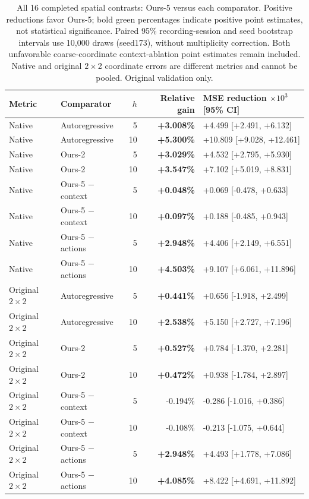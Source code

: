 \begin{table}[!htbp]
\centering\small
\setlength{\tabcolsep}{4pt}
\begin{tabular}{@{}llrrl@{}}
\toprule Metric & Comparator & $h$ & Relative gain & MSE reduction $\times10^3$ [95\% CI] \\
\midrule
Native & Autoregressive & 5 & \textcolor{gainpositive}{\textbf{+3.008\%}} & +4.499 [+2.491, +6.132] \\
Native & Autoregressive & 10 & \textcolor{gainpositive}{\textbf{+5.300\%}} & +10.809 [+9.028, +12.461] \\
Native & Ours-2 & 5 & \textcolor{gainpositive}{\textbf{+3.029\%}} & +4.532 [+2.795, +5.930] \\
Native & Ours-2 & 10 & \textcolor{gainpositive}{\textbf{+3.547\%}} & +7.102 [+5.019, +8.831] \\
Native & Ours-5 $-$ context & 5 & \textcolor{gainpositive}{\textbf{+0.048\%}} & +0.069 [-0.478, +0.633] \\
Native & Ours-5 $-$ context & 10 & \textcolor{gainpositive}{\textbf{+0.097\%}} & +0.188 [-0.485, +0.943] \\
Native & Ours-5 $-$ actions & 5 & \textcolor{gainpositive}{\textbf{+2.948\%}} & +4.406 [+2.149, +6.551] \\
Native & Ours-5 $-$ actions & 10 & \textcolor{gainpositive}{\textbf{+4.503\%}} & +9.107 [+6.061, +11.896] \\
\midrule
Original $2\!\times\!2$ & Autoregressive & 5 & \textcolor{gainpositive}{\textbf{+0.441\%}} & +0.656 [-1.918, +2.499] \\
Original $2\!\times\!2$ & Autoregressive & 10 & \textcolor{gainpositive}{\textbf{+2.538\%}} & +5.150 [+2.727, +7.196] \\
Original $2\!\times\!2$ & Ours-2 & 5 & \textcolor{gainpositive}{\textbf{+0.527\%}} & +0.784 [-1.370, +2.281] \\
Original $2\!\times\!2$ & Ours-2 & 10 & \textcolor{gainpositive}{\textbf{+0.472\%}} & +0.938 [-1.784, +2.897] \\
Original $2\!\times\!2$ & Ours-5 $-$ context & 5 & -0.194\% & -0.286 [-1.016, +0.386] \\
Original $2\!\times\!2$ & Ours-5 $-$ context & 10 & -0.108\% & -0.213 [-1.075, +0.644] \\
Original $2\!\times\!2$ & Ours-5 $-$ actions & 5 & \textcolor{gainpositive}{\textbf{+2.948\%}} & +4.493 [+1.778, +7.086] \\
Original $2\!\times\!2$ & Ours-5 $-$ actions & 10 & \textcolor{gainpositive}{\textbf{+4.085\%}} & +8.422 [+4.691, +11.892] \\
\bottomrule\end{tabular}
\caption{All 16 completed spatial contrasts: Ours-5 versus each comparator. Positive reductions favor Ours-5; bold green percentages indicate positive point estimates, not statistical significance. Paired 95\% recording-session and seed bootstrap intervals use 10,000 draws (seed173), without multiplicity correction. Both unfavorable coarse-coordinate context-ablation point estimates remain included. Native and original $2\times$2 coordinate errors are different metrics and cannot be pooled. Original validation only.}
\label{tab:spatial-versions-all}
\end{table}
